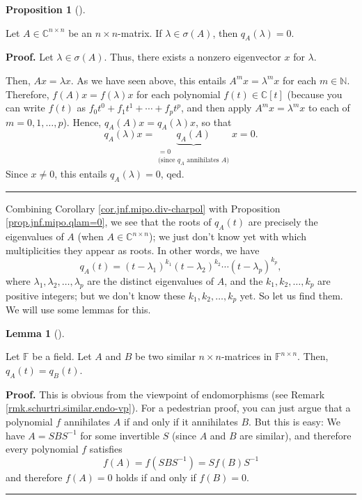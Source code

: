 \documentclass[numbers=enddot,12pt,final,onecolumn,notitlepage]{scrartcl}%
\numberwithin{exer}{subsection}
\theoremstyle{definition}
\newtheorem{lem}[theo]{Lemma}
\newenvironment{lemma}[1][]
{\begin{lem}[#1]\begin{leftbar}}
{\end{leftbar}\end{lem}}
\newtheorem{prop}[theo]{Proposition}
\newenvironment{proposition}[1][]
{\begin{prop}[#1]\begin{leftbar}}
{\end{leftbar}\end{prop}}
\newenvironment{proof}[1][Proof]{\noindent\textbf{#1.} }{\ \rule{0.5em}{0.5em}}
\begin{document}
\begin{proposition}
\label{prop.jnf.mipo.qlam=0}Let $A\in\mathbb{C}^{n\times n}$ be an $n\times
n$-matrix. If $\lambda\in\sigma\left(  A\right)  $, then $q_{A}\left(
\lambda\right)  =0$.
\end{proposition}

\begin{proof}
Let $\lambda\in\sigma\left(  A\right)  $. Thus, there exists a nonzero
eigenvector $x$ for $\lambda$.

Then, $Ax=\lambda x$. As we have seen above, this entails $A^{m}x=\lambda
^{m}x$ for each $m\in\mathbb{N}$. Therefore, $f\left(  A\right)  x=f\left(
\lambda\right)  x$ for each polynomial $f\left(  t\right)  \in\mathbb{C}%
\left[  t\right]  $ (because you can write $f\left(  t\right)  $ as
$f_{0}t^{0}+f_{1}t^{1}+\cdots+f_{p}t^{p}$, and then apply $A^{m}x=\lambda
^{m}x$ to each of $m=0,1,\ldots,p$). Hence, $q_{A}\left(  A\right)
x=q_{A}\left(  \lambda\right)  x$, so that%
\[
q_{A}\left(  \lambda\right)  x=\underbrace{q_{A}\left(  A\right)
}_{\substack{=0\\\text{(since }q_{A}\text{ annihilates }A\text{)}}}x=0.
\]
Since $x\neq0$, this entails $q_{A}\left(  \lambda\right)  =0$, qed.
\end{proof}

Combining Corollary \ref{cor.jnf.mipo.div-charpol} with Proposition
\ref{prop.jnf.mipo.qlam=0}, we see that the roots of $q_{A}\left(  t\right)  $
are precisely the eigenvalues of $A$ (when $A\in\mathbb{C}^{n\times n}$); we
just don't know yet with which multiplicities they appear as roots. In other
words, we have
\[
q_{A}\left(  t\right)  =\left(  t-\lambda_{1}\right)  ^{k_{1}}\left(
t-\lambda_{2}\right)  ^{k_{2}}\cdots\left(  t-\lambda_{p}\right)  ^{k_{p}},
\]
where $\lambda_{1},\lambda_{2},\ldots,\lambda_{p}$ are the distinct
eigenvalues of $A$, and the $k_{1},k_{2},\ldots,k_{p}$ are positive integers;
but we don't know these $k_{1},k_{2},\ldots,k_{p}$ yet. So let us find them.
We will use some lemmas for this.

\begin{lemma}
\label{lem.jnf.mipo.similar}Let $\mathbb{F}$ be a field. Let $A$ and $B$ be
two similar $n\times n$-matrices in $\mathbb{F}^{n\times n}$. Then,
$q_{A}\left(  t\right)  =q_{B}\left(  t\right)  $.
\end{lemma}

\begin{proof}
This is obvious from the viewpoint of endomorphisms (see Remark
\ref{rmk.schurtri.similar.endo-vp}). For a pedestrian proof, you can just
argue that a polynomial $f$ annihilates $A$ if and only if it annihilates $B$.
But this is easy: We have $A=SBS^{-1}$ for some invertible $S$ (since $A$ and
$B$ are similar), and therefore every polynomial $f$ satisfies
\[
f\left(  A\right)  =f\left(  SBS^{-1}\right)  =Sf\left(  B\right)  S^{-1}%
\]
and therefore $f\left(  A\right)  =0$ holds if and only if $f\left(  B\right)
=0$.
\end{proof}
\end{document}
